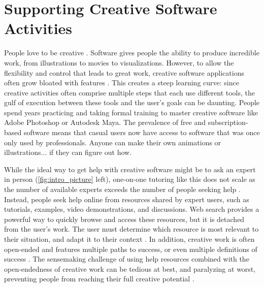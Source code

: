\chapter{Supporting Creative Software Activities}
People love to be creative \cite{Shneiderman2002}. Software gives people the ability to produce incredible work, from illustrations to movies to visualizations. However, to allow the flexibility and control that leads to great work, creative software applications often grow bloated with features \cite{MM-gi2000}. This creates a steep learning curve: since creative activities often comprise multiple steps that each use different tools, the gulf of execution \cite{Hutchins1985} between these tools and the user's goals can be daunting. People spend years practicing and taking formal training to master creative software like Adobe Photoshop or Autodesk Maya. The prevalence of free and subscription-based software means that casual users now have access to software that was once only used by professionals. Anyone can make their own animations or illustrations... if they can figure out how.

While the ideal way to get help with creative software might be to ask an expert in person (\autoref{fig:intro_picture} left), one-on-one tutoring like this does not scale as the number of available experts exceeds the number of people seeking help \cite{Bloom1984}. Instead, people seek help online from resources shared by expert users, such as tutorials, examples, video demonstrations, and discussions. Web search provides a powerful way to quickly browse and access these resources, but it is detached from the user's work. The user must determine which resource is most relevant to their situation, and adapt it to their context \cite{Ekstrand2011, Fourney2014Intertwine, Chilana2012, Lafreniere2014a}. In addition, creative work is often open-ended and features multiple paths to success, or even multiple definitions of success \cite{Shneiderman2007}. The sensemaking challenge of using help resources combined with the open-endedness of creative work can be tedious at best, and paralyzing at worst, preventing people from reaching their full creative potential \cite{Shneiderman2007}. 

